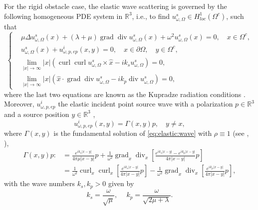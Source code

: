 \documentclass[a4paper,11pt]{article}
\theoremstyle{remark}
\theoremstyle{definition}
\numberwithin{equation}{section}
\DeclareMathOperator{\curl}{curl}
\DeclareMathOperator{\Div}{div}
\DeclareMathOperator{\grad}{grad}
\begin{document}
For the rigid obstacle case, the elastic wave scattering is governed by the following homogeneous PDE system in $\mathbb{R}^3$, i.e., to find $u_{\omega,\Omega}^{s} \in H^{1}_{loc}(\Omega^c)$, such that
\begin{equation}\label{eq:scat:pec}
\begin{cases}
&\mu \Delta u_{\omega,\Omega}^s(x) +(\lambda + \mu) \grad \Div u_{\omega,\Omega}^s(x) + \omega^2 u_{\omega,\Omega}^s(x)  = 0,
 \quad x \in \Omega^c,  \\
& u_{\omega,\Omega}^s(x) + u_{\omega,p,ep}^i(x,y) = 0, \quad x \in \partial \Omega, \quad y \in \Omega^{c},  \\
&\displaystyle{\lim_{|x| \rightarrow \infty}|x|( \curl \curl u_{\omega,\Omega}^s \times \hat{x} -i k_{s}u_{\omega,\Omega}^s) = 0}, \\
 & \displaystyle{\lim_{|x| \rightarrow \infty}|x|( \hat{x}\cdot \grad \Div u_{\omega,\Omega}^s -ik_p \Div u_{\omega,\Omega}^s) = 0},
\end{cases}
\end{equation}
where the last two equations are known as the Kupradze radiation conditions \cite{Kup}. Moreover, $u_{\omega,p,ep}^i$ the elastic incident point source wave with a polarization $p\in\mathbb{R}^3$ and a source position $y\in\mathbb{R}^3$ \cite{PHhab},
\begin{equation}\label{eq:point:source}
u_{\omega,p,ep}^{i}(x,y)=\Gamma(x,y)p, \quad y \neq x,
\end{equation}
where $\Gamma(x,y)$ is the fundamental solution of \eqref{eq:elastic:wave} with $\rho \equiv 1$ (see \cite[Chap. 5]{PHhab}, \cite{PH}),
\begin{align}
  \Gamma(x,y)p :&= \frac{e^{ik_{s}|x-y|}}{4 \pi  \mu |x-y|}p + \frac{1}{\omega^2}\grad_{x} \Div_{x} \left[\frac{e^{ik_s|x-y|} -e^{ik_p|x-y|}}{4 \pi |x-y|}p\right] \label{eq:pointsource:1}\\
&=   \frac{1}{\omega^2}\curl_{x} \curl_{x} \left[\frac{e^{ik_{s}|x-y|}}{4 \pi |x-y|}p\right] - \frac{1}{\omega^2} \grad_{x} \Div_{x} \left[\frac{e^{ik_{p}|x-y|}}{4 \pi |x-y|}p\right],\label{eq:point}
\end{align}
with the wave numbers $k_s, k_p > 0 $ given by
\begin{equation*}
k_s = \frac{\omega}{\sqrt{\mu}},\ \quad k_p = \frac{\omega}{\sqrt{2\mu + \lambda}}.
\end{equation*}
\end{document}
